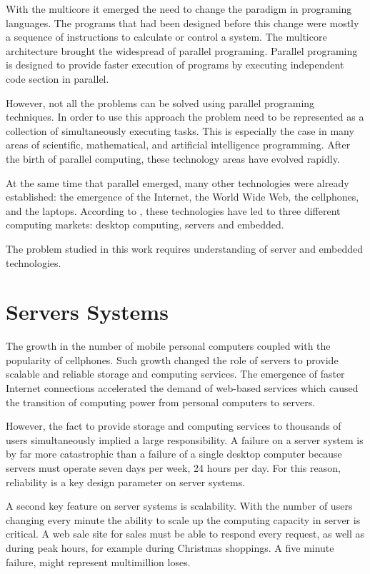 With the multicore it emerged the need to change the paradigm in programing
languages. The programs that had been designed before this change were mostly a
sequence of instructions to calculate or control a system. The multicore
architecture brought the widespread of parallel programing. Parallel programing
is designed to provide faster execution of programs by executing independent
code section in parallel.

However, not all the problems can be solved using parallel programing
techniques. In order to use this approach the problem need to be represented as
a collection of simultaneously executing tasks. This is especially the case in
many areas of scientific, mathematical, and artificial intelligence
programming. After the birth of parallel computing, these technology
areas have evolved rapidly.

At the same time that parallel emerged, many other technologies were already
established: the emergence of the Internet, the World Wide Web, the cellphones,
and the laptops. According to \cite{Hennessy}, these technologies have led to
three different computing markets: desktop computing, servers and embedded. 

The problem studied in this work requires understanding of server and
embedded technologies.

\section{Servers Systems}
\noindent

The growth in the number of mobile personal computers coupled with the
popularity of cellphones. Such growth changed the role of servers to provide
scalable and reliable storage and computing services. The emergence of faster
Internet connections accelerated the demand of web-based services which caused
the transition of computing power from personal computers to servers.

However, the fact to provide storage and computing services to thousands of
users simultaneously implied a large responsibility. A failure on a server
system is by far more catastrophic than a failure of a single desktop computer
because servers must operate seven days per week, 24 hours per day. For this
reason, reliability is a key design parameter on server systems.

A second key feature on server systems is scalability. With the number of users
changing every minute the ability to scale up the computing capacity
in server is critical. A web sale site for sales must be able to respond every
request, as well
as during peak hours, for example during Christmas shoppings. A five minute
failure, might represent multimillion loses.

